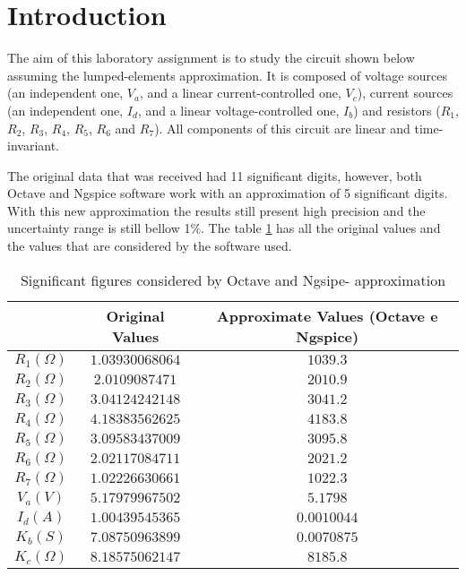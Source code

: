 \section{Introduction}
\label{sec:introduction}

\par
The aim of this laboratory assignment is to study the circuit shown below assuming the lumped-elements approximation. It is composed of voltage sources (an independent one, $V_a$, and a linear current-controlled one, $V_c$), current sources (an independent one, $I_d$, and a linear voltage-controlled one, $I_b$) and resistors ($R_1$, $R_2$, $R_3$, $R_4$, $R_5$, $R_6$ and $R_7$). All components of this circuit are linear and time-invariant.

The original data that was received had 11 significant digits, however, both Octave and Ngspice software work with an approximation of 5 significant digits. With this new approximation the results still present high precision and the uncertainty range is still bellow 1\%. The table \ref{tab:ap} has all the original values and the values that are considered by the software used. 


\begin{table}[hbt!]
\centering
\begin{tabular}{||c|c|c||}
\hline
        &           Original Values         & Approximate Values (Octave e Ngspice) \\ \hline
 $R_1 (\Omega)$   &  $   1.03930068064   $     & $1039.3$\\ \hline
 $R_2 (\Omega)$   &  $   2.0109087471    $      & $2010.9$\\ \hline
 $R_3 (\Omega)$   &  $   3.04124242148   $    & $3041.2$\\ \hline
 $R_4 (\Omega)$   &  $   4.18383562625   $     & $4183.8$\\ \hline
 $R_5 (\Omega)$   &  $   3.09583437009   $     & $3095.8$\\ \hline
 $R_6 (\Omega)$   &  $   2.02117084711   $     & $2021.2$\\ \hline
 $R_7 (\Omega)$   &  $   1.02226630661   $     & $1022.3$\\\hline
 $V_a (V)$   &  $   5.17979967502   $     & $5.1798$\\ \hline
 $I_d (A)$   &  $    1.00439545365     $     & $0.0010044$\\ \hline
 $K_b (S)$   &  $    7.08750963899     $     & $0.0070875$\\ \hline
 $K_c (\Omega)$   &     $8.18575062147    $     & $8185.8$\\ \hline
\end{tabular}
\caption{Significant figures considered by Octave and Ngsipe- approximation} 
\label{tab:ap}
\end{table}


